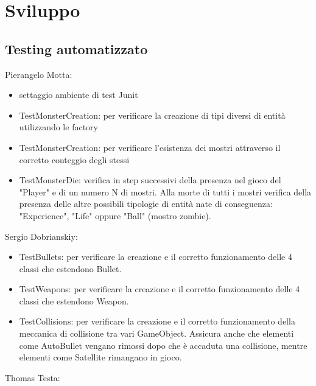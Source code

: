 \documentclass[a4paper,12pt]{report}
\begin{document}
\chapter{Sviluppo}
\section{Testing automatizzato}

Pierangelo Motta:
\begin{itemize}
	\item settaggio ambiente di test Junit
	\item TestMonsterCreation: per verificare la creazione di tipi diversi di entità utilizzando le factory
	\item TestMonsterCreation: per verificare l'esistenza dei mostri attraverso il corretto conteggio degli stessi
	\item TestMonsterDie: verifica in step successivi della presenza nel gioco del "Player" e di un numero N di mostri. Alla morte di tutti i mostri verifica della presenza delle altre possibili tipologie di entità nate di conseguenza: "Experience", "Life" oppure "Ball" (mostro zombie).
\end{itemize}
%
Sergio Dobrianskiy:
\begin{itemize}
	\item TestBullets: per verificare la creazione e il corretto funzionamento delle 4 classi che estendono Bullet.
	\item TestWeapons: per verificare la creazione e il corretto funzionamento delle 4 classi che estendono Weapon.
	\item TestCollisions: per verificare la creazione e il corretto funzionamento della meccanica di collisione tra vari GameObject. Assicura anche che elementi come AutoBullet vengano rimossi dopo che è accaduta una collisione, mentre elementi come Satellite rimangano in gioco.
\end{itemize}
%
Thomas Testa:
\end{document}
